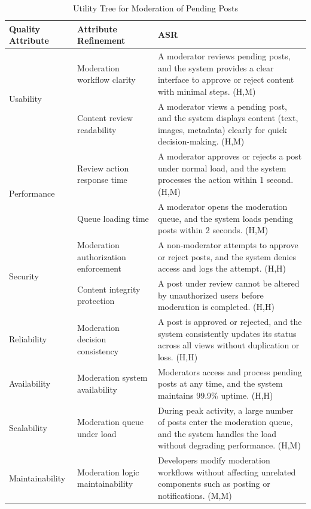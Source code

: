 \documentclass{article}
\begin{document}
\begin{table}[H]
\centering
\caption{Utility Tree for Moderation of Pending Posts}
\begin{tabular}{|p{3cm}|p{4cm}|p{7cm}|}
\hline
\textbf{Quality Attribute} & \textbf{Attribute Refinement} & \textbf{ASR} \\
\hline

\multirow{2}{*}{Usability}
& Moderation workflow clarity
& A moderator reviews pending posts, and the system provides a clear interface to approve or reject content with minimal steps. (H,M) \\
\cline{2-3}
& Content review readability
& A moderator views a pending post, and the system displays content (text, images, metadata) clearly for quick decision-making. (H,M) \\
\hline

\multirow{2}{*}{Performance}
& Review action response time
& A moderator approves or rejects a post under normal load, and the system processes the action within 1 second. (H,M) \\
\cline{2-3}
& Queue loading time
& A moderator opens the moderation queue, and the system loads pending posts within 2 seconds. (H,M) \\
\hline

\multirow{2}{*}{Security}
& Moderation authorization enforcement
& A non-moderator attempts to approve or reject posts, and the system denies access and logs the attempt. (H,H) \\
\cline{2-3}
& Content integrity protection
& A post under review cannot be altered by unauthorized users before moderation is completed. (H,H) \\
\hline

Reliability
& Moderation decision consistency
& A post is approved or rejected, and the system consistently updates its status across all views without duplication or loss. (H,H) \\
\hline

Availability
& Moderation system availability
& Moderators access and process pending posts at any time, and the system maintains 99.9\% uptime. (H,H) \\
\hline

Scalability
& Moderation queue under load
& During peak activity, a large number of posts enter the moderation queue, and the system handles the load without degrading performance. (H,M) \\
\hline

Maintainability
& Moderation logic maintainability
& Developers modify moderation workflows without affecting unrelated components such as posting or notifications. (M,M) \\
\hline


\end{tabular}
\end{table}
\end{document}
